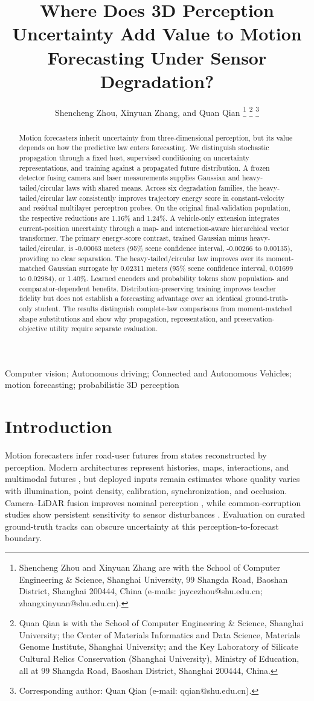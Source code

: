\documentclass[lettersize,journal]{IEEEtran}
\title{Where Does 3D Perception Uncertainty Add Value to Motion Forecasting Under Sensor Degradation?}
\author{Shencheng Zhou, Xinyuan Zhang, and Quan Qian%
\thanks{Shencheng Zhou and Xinyuan Zhang are with the School of Computer Engineering \& Science, Shanghai University, 99 Shangda Road, Baoshan District, Shanghai 200444, China (e-mails: jaycezhou@shu.edu.cn; zhangxinyuan@shu.edu.cn).}%
\thanks{Quan Qian is with the School of Computer Engineering \& Science, Shanghai University; the Center of Materials Informatics and Data Science, Materials Genome Institute, Shanghai University; and the Key Laboratory of Silicate Cultural Relics Conservation (Shanghai University), Ministry of Education, all at 99 Shangda Road, Baoshan District, Shanghai 200444, China.}%
\thanks{Corresponding author: Quan Qian (e-mail: qqian@shu.edu.cn).}}
\begin{document}
\raggedbottom
\maketitle

\begin{abstract}
Motion forecasters inherit uncertainty from three-dimensional perception, but its value depends on how the predictive law enters forecasting. We distinguish stochastic propagation through a fixed host, supervised conditioning on uncertainty representations, and training against a propagated future distribution. A frozen detector fusing camera and laser measurements supplies Gaussian and heavy-tailed/circular laws with shared means. Across six degradation families, the heavy-tailed/circular law consistently improves trajectory energy score in constant-velocity and residual multilayer perceptron probes. On the original final-validation population, the respective reductions are 1.16\% and 1.24\%. A vehicle-only extension integrates current-position uncertainty through a map- and interaction-aware hierarchical vector transformer. The primary energy-score contrast, trained Gaussian minus heavy-tailed/circular, is -0.00063 meters (95\% scene confidence interval, -0.00266 to 0.00135), providing no clear separation. The heavy-tailed/circular law improves over its moment-matched Gaussian surrogate by 0.02311 meters (95\% scene confidence interval, 0.01699 to 0.02984), or 1.40\%. Learned encoders and probability tokens show population- and comparator-dependent benefits. Distribution-preserving training improves teacher fidelity but does not establish a forecasting advantage over an identical ground-truth-only student. The results distinguish complete-law comparisons from moment-matched shape substitutions and show why propagation, representation, and preservation-objective utility require separate evaluation.
\end{abstract}

\begin{IEEEkeywords}
Computer vision; Autonomous driving; Connected and Autonomous Vehicles; motion forecasting; probabilistic 3D perception
\end{IEEEkeywords}

\section{Introduction}
\label{sec:section1}

Motion forecasters infer road-user futures from states reconstructed by perception. Modern architectures represent histories, maps, interactions, and multimodal futures \cite{ref1,ref2,ref3,ref4}, but deployed inputs remain estimates whose quality varies with illumination, point density, calibration, synchronization, and occlusion. Camera--LiDAR fusion improves nominal perception \cite{ref5}, while common-corruption studies show persistent sensitivity to sensor disturbances \cite{ref6,ref7}. Evaluation on curated ground-truth tracks can obscure uncertainty at this perception-to-forecast boundary.
\end{document}
